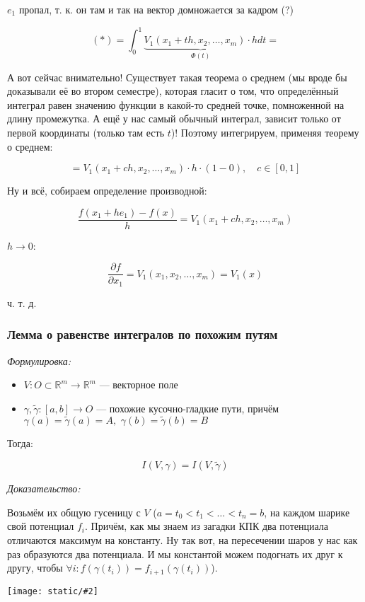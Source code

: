 \documentclass{article}
\def\dbl{\,\,}
\def\images#1#2{\begin{center}\texttt{[image: static/\#2]}\end{center}}
\begin{document}
$e_1$ пропал, т. к. он там и так на вектор домножается за кадром (?)

\[(*) = \int_{0}^{1} \underbrace{V_1(x_1 + th, x_2, \ldots, x_m) \cdot h}_{\Phi(t)}dt =\]

А вот сейчас внимательно! Существует такая теорема о среднем (мы вроде бы доказывали её во втором семестре), которая гласит о том, что определённый интеграл равен значению функции в какой-то средней точке, помноженной на длину промежутка. А ещё у нас самый обычный интеграл, зависит только от первой координаты (только там есть $t$)! Поэтому интегрируем, применяя теорему о среднем:

\[ = V_1(x_1 + ch, x_2, \ldots, x_m) \cdot h \cdot (1 - 0), \quad c \in [0, 1]\]

Ну и всё, собираем определение производной:

\[\frac{f(x_1 + he_1) - f(x)}{h} = V_1(x_1 + ch, x_2, \ldots, x_m)\]

$h \rightarrow 0$:

\[\frac{\partial f}{\partial x_1} = V_1(x_1, x_2, \ldots, x_m) = V_1(x)\]

ч. т. д. 

\subsubsection{Лемма о равенстве интегралов по похожим путям}
\textit{Формулировка:}

\begin{itemize}
    \item $V: O \subset \mathbb{R}^m \rightarrow \mathbb{R}^m$ --- векторное поле
    \item $\gamma, \tilde{\gamma}: [a, b] \rightarrow O$ --- похожие кусочно-гладкие пути, причём $\gamma(a) = \tilde{\gamma}(a) = A, \dbl \gamma(b) = \tilde{\gamma}(b) = B$
\end{itemize}

Тогда:

\[I(V, \gamma) = I(V, \tilde{\gamma})\]

\textit{Доказательство:}

Возьмём их общую гусеницу с $V$ ($a = t_0 < t_1 < \ldots < t_n = b$, на каждом шарике свой потенциал $f_i$. Причём, как мы знаем из загадки КПК два потенциала отличаются максимум на константу. Ну так вот, на пересечении шаров у нас как раз образуются два потенциала. И мы константой можем подогнать их друг к другу, чтобы $\forall i: f(\gamma(t_i)) = f_{i + 1}(\gamma(t_i))$).

\images{0.5}{lemm_pohoshie_putiii.jpg}
\end{document}
